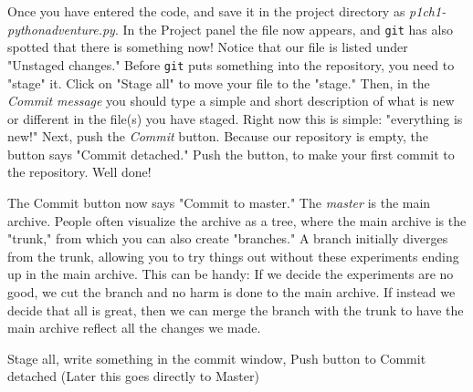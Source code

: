 Once you have entered the code, and save it in the project directory as \emph{p1ch1-pythonadventure.py}. In the Project panel the file now appears, and \texttt{git} has also spotted that there is something now! Notice that our file is listed under "Unstaged changes." Before \texttt{git} puts something into the repository, you need to "stage" it. Click on "Stage all" to move your file to the "stage." Then, in the \emph{Commit message} you should type a simple and short description of what is new or different in the file(s) you have staged. Right now this is simple: "everything is new!" Next, push the \emph{Commit} button. Because our repository is empty, the button says "Commit detached." Push the button, to make your first commit to the repository. Well done!

\begin{Exp} 
The Commit button now says "Commit to master." The \emph{master} is the main archive. People often visualize the archive as a tree, where the main archive is the "trunk," from which you can also create "branches." A branch initially diverges from the trunk, allowing you to try things out without these experiments ending up in the main archive. This can be handy: If we decide the experiments are no good, we cut the branch and no harm is done to the main archive. If instead we decide that all is great, then we can merge the branch with the trunk to have the main archive reflect all the changes we made.      \expend 
\end{Exp}
 
 
 
Stage all, 
write something in the commit window, 
Push button to Commit detached
(Later this goes directly to Master) 




   
   
   